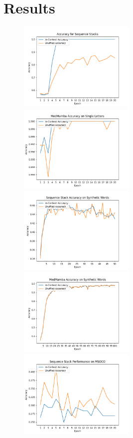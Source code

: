 \section{Results}
\begin{figure}[!ht]
    \includegraphics[width=0.5\textwidth]{figures/sequence_stack_mnist_like.png}
    \includegraphics[width=0.5\textwidth]{figures/medmamba_mnist_like.png}
    \includegraphics[width=0.5\textwidth]{figures/sequence_stack_words.png}
    \includegraphics[width=0.5\textwidth]{figures/medmamba_words.png}
    \includegraphics[width=0.5\textwidth]{figures/sequence_stack_mscoco.png}

\end{figure}
